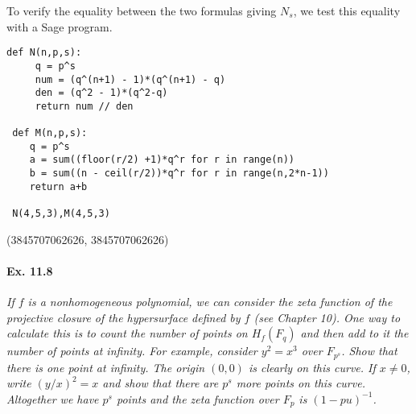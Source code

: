 \documentclass[11pt,a4paper]{article}
\begin{document}
To verify the equality between the two formulas giving $N_s$, we test this equality with a Sage program.
\begin{verbatim}
def N(n,p,s):
     q = p^s
     num = (q^(n+1) - 1)*(q^(n+1) - q)
     den = (q^2 - 1)*(q^2-q)
     return num // den
     
 def M(n,p,s):
    q = p^s
    a = sum((floor(r/2) +1)*q^r for r in range(n))
    b = sum((n - ceil(r/2))*q^r for r in range(n,2*n-1))
    return a+b
    
 N(4,5,3),M(4,5,3)
\end{verbatim}
\begin{center}
(3845707062626, 3845707062626)
\end{center}


\paragraph{Ex. 11.8}{\it If $f$ is a nonhomogeneous polynomial, we can consider the zeta function of the projective closure of the hypersurface defined by $f$ (see Chapter 10). One way to calculate this is to count the number of points on $H_f(F_q)$ and then add to it the number of points at infinity. For example, consider $y^2 = x^3$ over $F_{p^s}$. Show that there is one point at infinity. The origin $(0,0)$ is clearly on this curve. If $x \ne 0$, write $(y/x)^2 = x$ and show that there are $p^s$ more points on this curve. Altogether we have $p^s$ points and the zeta function over $F_p$ is $(1-pu)^{-1}$.
}
\end{document}
